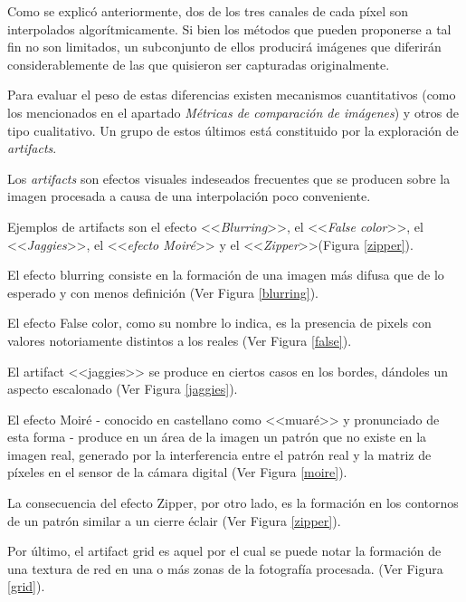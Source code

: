 \documentclass[a4paper]{article}
\begin{document}
Como se explicó anteriormente, dos de los tres canales de cada p\'ixel son interpolados algorítmicamente. Si bien los métodos que pueden proponerse a tal fin no son limitados, un subconjunto de ellos producirá imágenes que diferirán considerablemente de las que quisieron ser capturadas originalmente. 

Para evaluar el peso de estas diferencias  existen mecanismos cuantitativos (como los mencionados en el apartado \emph{M\'etricas de comparaci\'on de im\'agenes}) y otros de tipo cualitativo. Un grupo de estos últimos está constituido por la exploración de \textit{artifacts}.

Los \textit{artifacts} son efectos visuales indeseados frecuentes que se producen sobre la imagen procesada a causa de una interpolación poco conveniente. 

Ejemplos de artifacts son el efecto <<\emph{Blurring}>>, el <<\emph{False color}>>, el <<\emph{Jaggies}>>,   el <<\emph{efecto Moiré}>> y el <<\emph{Zipper}>>(Figura \ref{zipper}).

El efecto blurring consiste en la formación de una imagen más difusa que de lo esperado y con menos definición (Ver Figura \ref{blurring}). 

El efecto False color, como su nombre lo indica, es la presencia de pixels con valores notoriamente distintos a los reales (Ver Figura \ref{false}). 

El artifact <<jaggies>> se produce en ciertos casos en los bordes, dándoles un aspecto escalonado (Ver Figura \ref{jaggies}).

El efecto Moiré - conocido en castellano como <<muaré>> y pronunciado de esta forma - produce en un área de la imagen un patrón que no existe en la imagen real, generado por la interferencia entre el patrón real y la matriz de píxeles en el sensor de la cámara digital (Ver Figura \ref{moire}).

La consecuencia del efecto Zipper, por otro lado, es la formación en los contornos de un patrón similar a un cierre éclair (Ver Figura \ref{zipper}).

Por último, el artifact grid es aquel por el cual se puede notar la formación de una textura de red en una o más zonas de la fotografía procesada. (Ver Figura \ref{grid}). 
\end{document}

